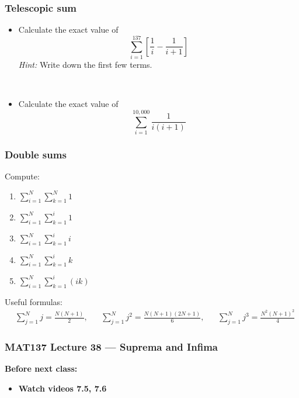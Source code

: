 \documentclass[14pt]{beamer}
\newcommand{\p}{\pause}
\newcommand{\setsize}[1]{\fontsize{#1}{#1}\selectfont} %
\begin{document}
	\begin{frame}[t]
		\frametitle{Telescopic sum}

		\begin{itemize}
			\item Calculate the exact value of
				\[
					\sum_{i=1}^{137}\left[ \frac{1}{i}- \frac{1}{i+1}\right]
				\]
				\emph{Hint:} Write down the first few terms.

				\p \


			\item Calculate the exact value of
				\[
					\sum_{i=1}^{10,000}\frac{1}{i(i+1)}
				\]
		\end{itemize}
	\end{frame}

	\begin{frame}[t]
		\frametitle{Double sums}

		Compute:
		\begin{multicols}{3}
			\begin{enumerate}
				\item ${\displaystyle \sum_{i=1}^{N} \sum_{k=1}^N 1 }$

				\item ${\displaystyle  \sum_{i=1}^{N} \sum_{k=1}^{i} 1}$

				\item ${\displaystyle  \sum_{i=1}^{N} \sum_{k=1}^{i} i}$

				\item ${\displaystyle  \sum_{i=1}^{N} \sum_{k=1}^i k }$

				\item ${\displaystyle  \sum_{i=1}^{N} \sum_{k=1}^i (ik) }$
			\end{enumerate}
		\end{multicols}

		\vfill

		{\setsize{10} Useful formulas: \begin{align*}&\sum_{j=1}^{N}j = \frac{N(N+1)}{2},&&\sum_{j=1}^{N} j^{2} = \frac{N(N+1)(2N+1)}{6},&&\sum_{j=1}^{N}j^{3} = \frac{N^{2}(N+1)^{2}}{4}\end{align*} }
	\end{frame}

\begin{frame}
	\frametitle{MAT137 Lecture 38 --- Suprema and Infima}

	\vfill
	{\bf Before next class:}
		\begin{itemize} \normalsize
			\item {\bf Watch videos 7.5, 7.6}
		\end{itemize}
\end{frame}
\end{document}
